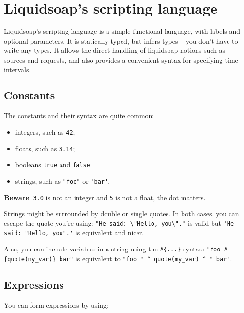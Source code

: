 \section{Liquidsoap's scripting language}
Liquidsoap's scripting language is a simple functional language,
with labels and optional parameters.
It is statically typed, but infers types -- you don't have to write any types.
It allows the direct handling of liquidsoap notions such
as \href{sources.html}{sources} and \href{requests.html}{requests},
and also provides a convenient syntax for specifying time intervals.

\subsection{Constants}
The constants and their syntax are quite common:

\begin{itemize}
\item integers, such as \verb+42+;
\item floats, such as \verb+3.14+;
\item booleans \verb+true+ and \verb+false+;
\item strings, such as \verb+"foo"+ or \verb+'bar'+.

\end{itemize}
\textbf{Beware}: \verb+3.0+ is not an integer and \verb+5+ is not a float, the dot matters.

Strings might be surrounded by double or single quotes. In both cases, you can escape the quote you're using: \verb+"He said: \"Hello, you\"."+ is valid but \verb+'He said: "Hello, you".'+ is equivalent and nicer.

Also, you can include variables in a string using the \verb+#{...}+
syntax: 
\verb+"foo #{quote(my_var)} bar"+ is equivalent to
\verb+"foo " ^ quote(my_var) ^ " bar"+.

\subsection{Expressions}
You can form expressions by using:

